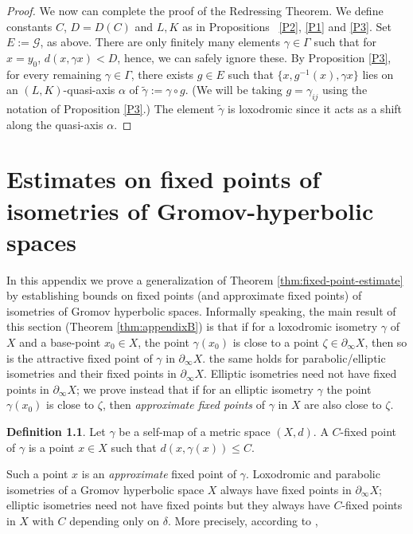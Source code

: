 \documentclass[12pt]{amsbook}%
\theoremstyle{definition}
\newtheorem{defi}[thm]{Definition}
\theoremstyle{remark}
\numberwithin{section}{chapter}
\numberwithin{subsection}{section}
\numberwithin{figure}{chapter}
\def\ga{\gamma}
\def\geo{\partial_\infty}
\begin{document}
{{\begin{proof}
\medskip
We now can complete the proof of the Redressing Theorem.  We define constants $C$, $D=D(C)$ and $L, K$ as in Propositions \ \ref{P2},  \ref{P1} and \ref{P3}. Set $E:={\mathcal G}$, as above. There are only finitely many elements $\gamma\in \Gamma$ such that for $x=y_0$, 
$d(x, \gamma x)<D$, hence, we can safely ignore these. By Proposition \ref{P3}, for every remaining 
$\gamma\in \Gamma$, there exists $g\in E$ such that $\{x, g^{-1}(x), \gamma x\}$ lies on an 
$(L,K)$-quasi-axis $\alpha$ of $\tilde{\gamma}:= \gamma\circ g$. (We will be taking $g=\ga_{ij}$ using the notation of Proposition \ref{P3}.) 
The element $\tilde \gamma$ is loxodromic since it acts as a shift along the quasi-axis $\alpha$.  \end{proof}






\chapter[Appendix B]{%
Estimates on fixed points of isometries of Gromov-hyperbolic spaces} \label{sec:appendixB}



In this appendix we prove a generalization of Theorem \ref{thm:fixed-point-estimate} by establishing bounds on fixed points (and approximate fixed points) of isometries of Gromov hyperbolic spaces. Informally speaking, the main result of this section (Theorem \ref{thm:appendixB}) 
 is that if for a loxodromic isometry $\ga$ of $X$ and a base-point $x_0\in X$, the point $\ga(x_0)$ is close to a point $\zeta\in \geo X$, then so is the attractive fixed point of $\ga$ in $\geo X$. the same holds for parabolic/elliptic 
isometries and their fixed points in $\geo X$. Elliptic isometries need not have fixed points in $\geo X$; we prove instead that if 
for an elliptic isometry  $\ga$ the point $\ga(x_0)$ is close to $\zeta$, then {\em approximate fixed points} of $\ga$ in $X$ are also close to $\zeta$. 




\begin{defi}
Let $\ga$ be a self-map of a metric space $(X,d)$. A $C$-fixed point of $\ga$ is a point $x\in X$ such that $d(x, \ga(x))\leqslant C$. 
\end{defi}

Such a point $x$ is an {\em approximate} fixed point of $\ga$. Loxodromic and parabolic isometries of a Gromov hyperbolic space $X$ always have fixed points 
in $\geo X$; elliptic isometries need not have fixed points but they always have $C$-fixed points in $X$ with $C$ depending only on $\delta$. More precisely, 
according to \cite[Ch. 8, Proposition 24]{Ghys-book}, 

}}
\end{document}
